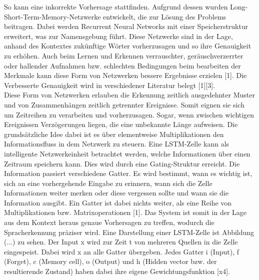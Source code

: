 So kann eine inkorrekte Vorhersage stattfinden. Aufgrund dessen wurden Long-Short-Term-Memory-Netzwerke entwickelt, die zur Lösung des Problems beitragen. Dabei werden Recurrent Neural Networks mit einer Speicherstruktur erweitert, was zur Namensgebung führt. Diese Netzwerke sind in der Lage, anhand des Kontextes zukünftige Wörter vorherzusagen und so ihre Genauigkeit zu erhöhen. Auch beim Lernen und Erkennen verrauschter, geräuschverzerrter oder hallender Aufnahmen bzw. schlechten Bedingungen beim bearbeiten der Merkmale kann diese Form von Netzwerken bessere Ergebnisse erzielen [1]. Die Verbesserte Genauigkeit wird in verschiedener Literatur belegt [1][3]. 
\\
Diese Form von Netzwerken erlauben die Erkennung zeitlich ausgedehnter Muster und von Zusammenhängen zeitlich getrennter Ereignisse. Somit eignen sie sich um Zeitreihen zu verarbeiten und vorherzusagen. Sogar, wenn zwischen wichtigen Ereignissen Verzögerungen liegen, die eine unbekannte Länge aufweisen. 
Die grundsätzliche Idee dabei ist es über elementweise Multiplikationen den Informationsfluss in dem Netzwerk zu steuern. Eine LSTM-Zelle kann als intelligente Netzwerkeinheit betrachtet werden, welche Informationen über einen Zeitraum speichern kann. Dies wird durch eine Gating-Struktur erreicht. Die Information passiert verschiedene Gatter. Es wird bestimmt, wann es wichtig ist, sich an eine vorhergehende Eingabe zu erinnern, wann sich die Zelle Informationen weiter merken oder diese vergessen sollte und wann sie die Information ausgibt. Ein Gatter ist dabei nichts weiter, als eine Reihe von Multiplikationen bzw. Matrixoperationen [1]. 
Das System ist somit in der Lage aus dem Kontext heraus genaue Vorhersagen zu treffen, wodurch die Spracherkennung präziser wird. Eine Darstellung einer LSTM-Zelle ist Abbildung (...) zu sehen. Der Input x wird zur Zeit t von mehreren Quellen in die Zelle eingespeist. Dabei wird x an alle Gatter übergeben. Jedes Gatter i (Input), f (Forget), c (Memory cell), o (Output) und h (Hidden vector bzw. der resultierende Zustand) haben dabei ihre eigene Gewichtungsfunktion [x4].   

